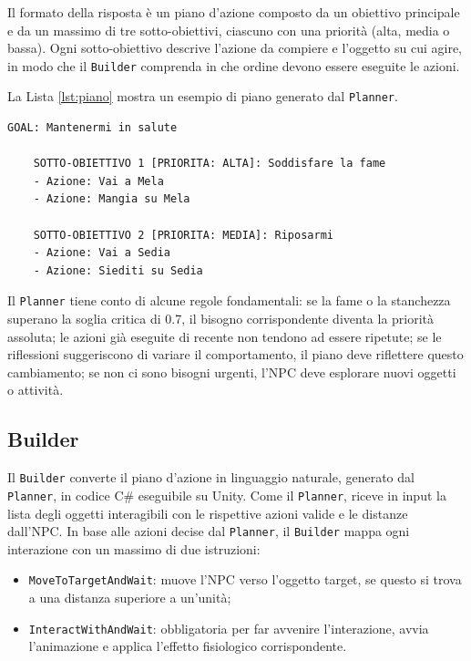 Il formato della risposta è un piano d'azione composto da un obiettivo principale e da un massimo di tre sotto-obiettivi, ciascuno con una priorità (alta, media o bassa). Ogni sotto-obiettivo descrive l'azione da compiere e l'oggetto su cui agire, in modo che il \texttt{Builder} comprenda in che ordine devono essere eseguite le azioni.

La Lista \ref{lst:piano} mostra un esempio di piano generato dal \texttt{Planner}.

\begin{lstlisting}[style=jsonstyle, caption={Esempio di piano generato dal Planner.}, label={lst:piano}]
	GOAL: Mantenermi in salute
	
	SOTTO-OBIETTIVO 1 [PRIORITA: ALTA]: Soddisfare la fame
	- Azione: Vai a Mela
	- Azione: Mangia su Mela
	
	SOTTO-OBIETTIVO 2 [PRIORITA: MEDIA]: Riposarmi
	- Azione: Vai a Sedia
	- Azione: Siediti su Sedia
\end{lstlisting}

Il \texttt{Planner} tiene conto di alcune regole fondamentali: se la fame o la stanchezza superano la soglia critica di 0.7, il bisogno corrispondente diventa la priorità assoluta; le azioni già eseguite di recente non tendono ad essere ripetute; se le riflessioni suggeriscono di variare il comportamento, il piano deve riflettere questo cambiamento; se non ci sono bisogni urgenti, l'NPC deve esplorare nuovi oggetti o attività.

\subsection{Builder}

Il \texttt{Builder} converte il piano d'azione in linguaggio naturale, generato dal \texttt{Planner}, in codice C\# eseguibile su Unity. Come il \texttt{Planner}, riceve in input la lista degli oggetti interagibili con le rispettive azioni valide e le distanze dall'NPC. In base alle azioni decise dal \texttt{Planner}, il \texttt{Builder} mappa ogni interazione con un massimo di due istruzioni:

\begin{itemize}
	\item \texttt{MoveToTargetAndWait}: muove l'NPC verso l'oggetto target, se questo si trova a una distanza superiore a un'unità;
	\item \texttt{InteractWithAndWait}: obbligatoria per far avvenire l'interazione, avvia l'animazione e applica l'effetto fisiologico corrispondente.
\end{itemize}

